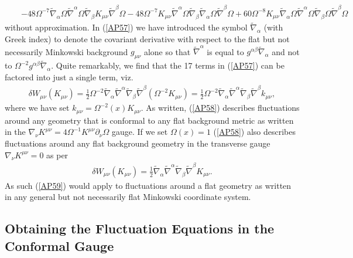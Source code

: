 \documentclass[aps]{revtex4}
\begin{document}
\begin{eqnarray}
\nonumber\\
&&-  48\Omega^{-7}  \tilde{\nabla}_{\alpha}\Omega \tilde{\nabla}^{\alpha}\Omega \tilde{\nabla}_{\beta}K_{\mu \nu} \tilde{\nabla}^{\beta}\Omega
-  48\Omega^{-7}  K_{\mu \nu} \tilde{\nabla}^{\alpha}\Omega \tilde{\nabla}_{\beta}\tilde{\nabla}_{\alpha}\Omega \tilde{\nabla}^{\beta}\Omega+ 60\Omega^{-8} K_{\mu \nu} \tilde{\nabla}_{\alpha}\Omega \tilde{\nabla}^{\alpha}\Omega \tilde{\nabla}_{\beta}\Omega \tilde{\nabla}^{\beta}\Omega
\label{AP57}
\end{eqnarray}
%
without approximation. In (\ref{AP57}) we have introduced the symbol $\tilde{\nabla}_{\alpha}$ (with Greek index) to denote the covariant derivative with respect to the flat but not necessarily Minkowski background $g_{\mu\nu}$ alone so that $\tilde{\nabla}^{\alpha}$ is equal to $g^{\alpha\beta}\tilde{\nabla}_{\alpha}$ and not to $\Omega^{-2}g^{\alpha\beta}\tilde{\nabla}_{\alpha}$. Quite  remarkably, we find that the 17 terms in (\ref{AP57}) can be factored into just a single term, viz.
%
\begin{eqnarray}
\delta W_{\mu\nu}(K_{\mu\nu})=\frac{1}{2}\Omega^{-2}\tilde{\nabla}_{\alpha}\tilde{\nabla}^{\alpha}\tilde{\nabla}_{\beta}\tilde{\nabla}^{\beta}(\Omega^{-2}K_{\mu\nu})
=\frac{1}{2}\Omega^{-2}\tilde{\nabla}_{\alpha}\tilde{\nabla}^{\alpha}\tilde{\nabla}_{\beta}\tilde{\nabla}^{\beta}k_{\mu\nu},
\label{AP58}
\end{eqnarray}
%
where we have set $k_{\mu\nu}=\Omega^{-2}(x)K_{\mu\nu}$. As written, (\ref{AP58}) describes fluctuations around any geometry that is conformal to any flat background metric as written in  the  $\nabla_{\nu}K^{\mu\nu}=4\Omega^{-1}K^{\mu\nu}\partial_{\nu}\Omega$ gauge. If we set $\Omega(x)=1$  (\ref{AP58}) also describes fluctuations around any flat background geometry in the transverse gauge $\nabla_{\nu}K^{\mu\nu}=0$ as per 
%
\begin{eqnarray}
\delta W_{\mu\nu}(K_{\mu\nu})=\frac{1}{2}\tilde{\nabla}_{\alpha}\tilde{\nabla}^{\alpha}\tilde{\nabla}_{\beta}\tilde{\nabla}^{\beta}K_{\mu\nu}.
\label{AP59}
\end{eqnarray}
%
As such (\ref{AP59}) would apply to fluctuations around a flat geometry as written in any general but not necessarily flat Minkowski coordinate system.

\subsection{Obtaining the Fluctuation Equations in the Conformal Gauge}
\end{document}
